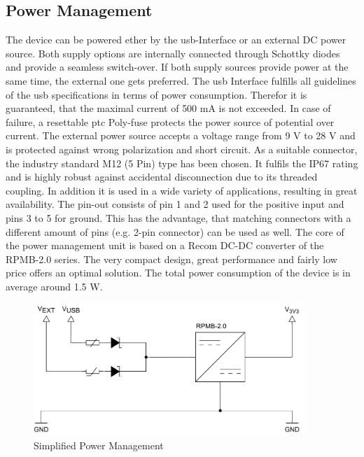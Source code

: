 \subsection{Power Management}
The device can be powered ether by the \acrshort{usb}-Interface or an external DC power source. Both supply options are internally connected through Schottky diodes and provide a seamless switch-over. If both supply sources provide power at the same time, the external one gets preferred.\newline
The \acrfull{usb} Interface fulfills all guidelines of the \acrshort{usb} specifications in terms of power consumption. Therefor it is guaranteed, that the maximal current of 500 mA is not exceeded. In case of failure, a resettable \acrshort{ptc} Poly-fuse protects the power source of potential over current.\newline
The external power source accepts a voltage range from 9 V to 28 V and is protected against wrong polarization and short circuit. As a suitable connector, the industry standard M12 (5 Pin) type has been chosen. It fulfils the IP67 rating and is highly robust against accidental disconnection due to its threaded coupling. In addition it is used in a wide variety of applications, resulting in great availability. The pin-out consists of pin 1 and 2 used for the positive input and pins 3 to 5 for ground. This has the advantage, that matching connectors with a different amount of pins (e.g. 2-pin connector) can be used as well.\newline
The core of the power management unit is based on a Recom DC-DC converter of the RPMB-2.0 series. The very compact design, great performance and fairly low price offers an optimal solution.\newline
The total power consumption of the device is in average around 1.5 W.

\bigskip
\begin{figure}[h!]
	\centering
	\includegraphics[height=5cm]{images/power}
	\caption{Simplified Power Management}
	\label{fig:simplified-power}
\end{figure}
\newpage

